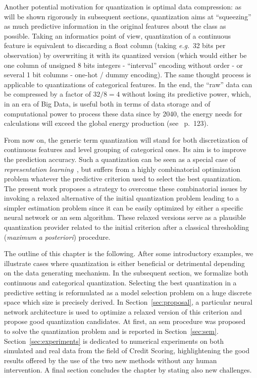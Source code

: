 Another potential motivation for quantization is optimal data compression: as will be shown rigorously in subsequent sections, quantization aims at ``squeezing'' as much predictive information in the original features about the class as possible. Taking an informatics point of view, quantization of a continuous feature is equivalent to discarding a float column (taking \textit{e.g.}\ 32 bits per observation) by overwriting it with its quantized version (which would either be one column of unsigned 8 bits integers - ``interval'' encoding without order - or several 1 bit columns - one-hot / dummy encoding). The same thought process is applicable to quantizations of categorical features. In the end, the ``raw'' data can be compressed by a factor of $32 / 8 = 4$ without losing its predictive power, which, in an era of Big Data, is useful both in terms of data storage and of computational power to process these data since by 2040, the energy needs for calculations will exceed the global energy production (see~\cite{villani2018donner} p.\ 123).

From now on, the generic term quantization will stand for both discretization of continuous features and level grouping of categorical ones. Its aim is to improve the prediction accuracy. Such a quantization can be seen as a special case of \textit{representation learning}~\cite{bengio2013representation}, but suffers from a highly combinatorial optimization problem whatever the predictive criterion used to select the best quantization. The present work proposes a strategy to overcome these combinatorial issues by invoking a relaxed alternative of the initial quantization problem leading to a simpler estimation problem since it can be easily optimized by either a specific neural network or an \gls{sem} algorithm. These relaxed versions serve as a plausible quantization provider related to the initial criterion after a classical thresholding (\textit{maximum a posteriori}) procedure.

The outline of this chapter is the following. After some introductory examples, we illustrate cases where quantization is either beneficial or detrimental depending on the data generating mechanism. In the subsequent section, we formalize both continuous and categorical quantization. Selecting the best quantization in a predictive setting is reformulated as a model selection problem on a huge discrete space which size is precisely derived. In Section~\ref{sec:proposal}, a particular neural network architecture is used to optimize a relaxed version of this criterion and propose good quantization candidates. At first, an \gls{sem} procedure was proposed to solve the quantization problem and is reported in Section~\ref{sec:sem}. Section~\ref{sec:experiments} is dedicated to numerical experiments on both simulated and real data from the field of Credit Scoring, highlightening the good results offered by the use of the two new methods without any human intervention. A final section concludes the chapter by stating also new challenges.

